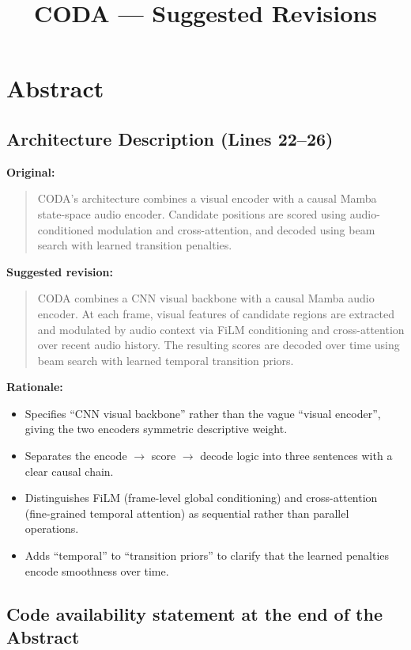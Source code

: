 \documentclass{article}
\title{CODA --- Suggested Revisions}
\date{}
\begin{document}
\maketitle

\section*{Abstract}

\subsection*{Architecture Description (Lines 22--26)}

\textbf{Original:}
\begin{quote}
CODA's architecture combines a visual encoder with a causal Mamba state-space audio encoder.
Candidate positions are scored using audio-conditioned modulation and cross-attention, and decoded
using beam search with learned transition penalties.
\end{quote}

\textbf{Suggested revision:}
\begin{quote}
CODA combines a CNN visual backbone with a causal Mamba audio encoder.
At each frame, visual features of candidate regions are extracted and modulated by audio context
via FiLM conditioning and cross-attention over recent audio history.
The resulting scores are decoded over time using beam search with learned temporal transition priors.
\end{quote}

\textbf{Rationale:}
\begin{itemize}
    \item Specifies ``CNN visual backbone'' rather than the vague ``visual encoder'', giving the two encoders symmetric descriptive weight.
    \item Separates the encode $\to$ score $\to$ decode logic into three sentences with a clear causal chain.
    \item Distinguishes FiLM (frame-level global conditioning) and cross-attention (fine-grained temporal attention) as sequential rather than parallel operations.
    \item Adds ``temporal'' to ``transition priors'' to clarify that the learned penalties encode smoothness over time.
\end{itemize}

\subsection*{Code availability statement at the end of the Abstract}
\end{document}
